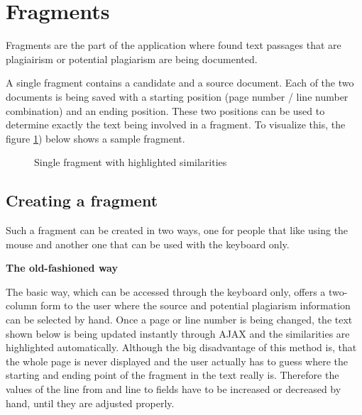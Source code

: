 \section{Fragments}

Fragments are the part of the application where found text passages that are plagiairism or potential plagiarism are being documented.

A single fragment contains a candidate and a source document. Each of the two documents is being saved with a starting position (page number / line number combination) and an ending position. These two positions can be used to determine exactly the text being involved in a fragment. To visualize this, the figure \ref{fig:single-fragment}) below shows a sample fragment.

\begin{figure}[!h]
  \centering
  \caption{Single fragment with highlighted similarities}
  \label{fig:single-fragment}
\end{figure}

\subsection{Creating a fragment}

Such a fragment can be created in two ways, one for people that like using the mouse and another one that can be used with the keyboard only.

\textbf{The old-fashioned way}

The basic way, which can be accessed through the keyboard only, offers a two-column form to the user where the source and potential plagiarism information can be selected by hand. Once a page or line number is being changed, the text shown below is being updated instantly through AJAX and the similarities are highlighted automatically. Although the big disadvantage of this method is, that the whole page is never displayed and the user actually has to guess where the starting and ending point of the fragment in the text really is. Therefore the values of the line from and line to fields have to be increased or decreased by hand, until they are adjusted properly.

